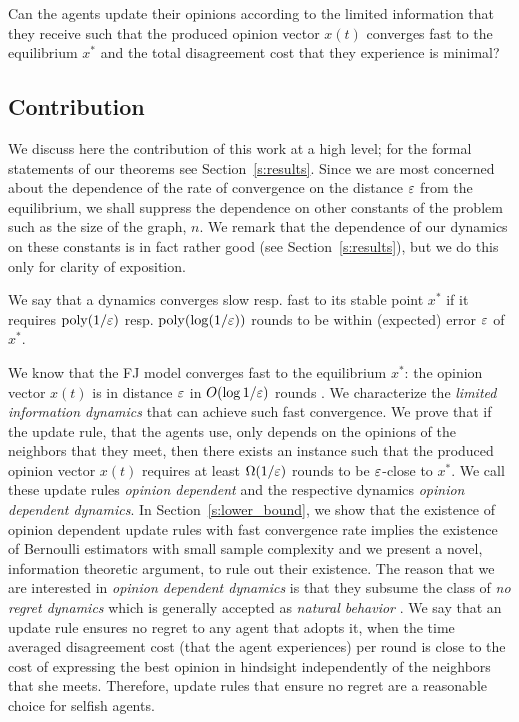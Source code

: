\begin{question}\label{q:motivation2}
  Can the agents update their opinions according to the limited information
  that they receive such that the produced opinion vector $x(t)$ converges
  fast to the equilibrium $x^*$ and the total disagreement cost that they
  experience is minimal?
%
\end{question}

\subsection{Contribution}
We discuss here the contribution of this work at a high level; for
the formal statements of our theorems see Section~\ref{s:results}.
Since we are most concerned about the dependence of the rate of convergence
on the distance $\varepsilon$ from the equilibrium, we shall suppress the dependence on
other constants of the problem such as the size of the graph, $n$.  We remark
that the dependence of our dynamics on these constants is in fact rather good
(see Section~\ref{s:results}), but we do this only for clarity of exposition.

\begin{definition}[Informal]\label{d:convergence_rate}
  We say that a dynamics converges slow resp. fast to its stable point $x^*$ if it
  requires $\mathrm{poly}(1/\varepsilon)$ resp. $\mathrm{poly}(\log(1/\varepsilon))$ rounds to be
  within (expected) error $\varepsilon$ of $x^*$.
\end{definition}

 We know that the FJ model converges fast to the equilibrium $x^*$: the opinion vector
 $x(t)$ is in distance $\varepsilon$ in $O(\log 1/\varepsilon)$ rounds \cite{GS14}.  We characterize
 the \emph{limited
  information dynamics} that can achieve such fast convergence.  We prove that
if the update rule, that the agents use, only depends on the opinions of the
neighbors that they meet, then there exists an instance such that the produced
opinion vector $x(t)$ requires at least $\Omega(1/\varepsilon)$ rounds to be
$\varepsilon$-close to $x^*$. We call these update rules \emph{opinion dependent} and
the respective dynamics \emph{opinion dependent dynamics}.  In
Section~\ref{s:lower_bound}, we show that the existence of opinion dependent
update rules with fast convergence rate implies the existence of Bernoulli
estimators with small sample complexity and we present a novel, information
theoretic argument, to rule out their existence.  The reason that we are
interested in \emph{opinion dependent dynamics} is that they subsume the class
of \emph{no regret dynamics} which is generally accepted as
\emph{natural behavior}  \cite{EMN09}.
We say that an update rule ensures no regret to any agent that adopts it, when
the time averaged disagreement cost (that the agent experiences) per round is
close to the cost of expressing the best opinion in hindsight independently of
the neighbors that she meets. Therefore, update rules that ensure no regret are
a reasonable choice for selfish agents.

